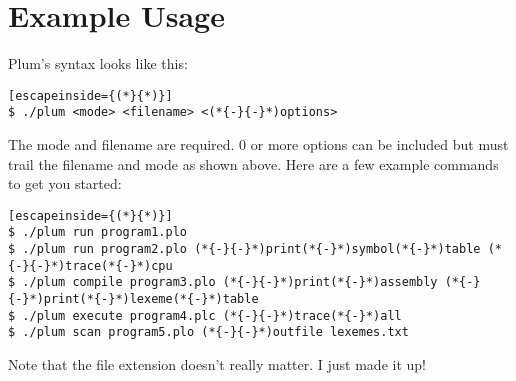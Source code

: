 \documentclass[12pt]{memoir}
\begin{document}
\section*{Example Usage}
Plum's syntax looks like this:
\begin{lstlisting}[escapeinside={(*}{*)}]
$ ./plum <mode> <filename> <(*{-}{-}*)options>
\end{lstlisting}
The mode and filename are required. 0 or more options can be included but must trail
the filename and mode as shown above. Here are a few example commands to get you started:
\begin{lstlisting}[escapeinside={(*}{*)}]
$ ./plum run program1.plo
$ ./plum run program2.plo (*{-}{-}*)print(*{-}*)symbol(*{-}*)table (*{-}{-}*)trace(*{-}*)cpu
$ ./plum compile program3.plo (*{-}{-}*)print(*{-}*)assembly (*{-}{-}*)print(*{-}*)lexeme(*{-}*)table
$ ./plum execute program4.plc (*{-}{-}*)trace(*{-}*)all
$ ./plum scan program5.plo (*{-}{-}*)outfile lexemes.txt
\end{lstlisting}
Note that the file extension doesn't really matter. I just made it up!

\pagebreak
\end{document}
